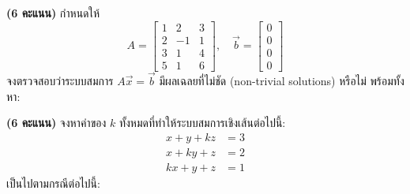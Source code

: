 ﻿\documentclass[12pt, a4paper]{exam}
\begin{document}
\begin{questions}

\newpage

\question \textbf{(6 คะแนน)} กำหนดให้
\[
A = \begin{bmatrix} 
1 & 2 & 3 \\ 
2 & -1 & 1 \\ 
3 & 1 & 4 \\ 
5 & 1 & 6 
\end{bmatrix}, \quad
\vec{b} = \begin{bmatrix} 
0 \\ 0 \\ 0 \\ 0 
\end{bmatrix}
\]
จงตรวจสอบว่าระบบสมการ $A\vec{x} = \vec{b}$ มีผลเฉลยที่ไม่ชัด (non-trivial solutions) \mbox{หรือไม่} พร้อมทั้งหา:

\newpage

\question \textbf{(6 คะแนน)} จงหาค่าของ $k$ ทั้งหมดที่ทำให้ระบบสมการเชิงเส้นต่อไปนี้:
\[
\begin{aligned}
x + y + kz &= 3 \\
x + ky + z &= 2 \\
kx + y + z &= 1
\end{aligned}
\]
เป็นไปตามกรณีต่อไปนี้:
\begin{parts}

\end{parts}
\end{questions}
\end{document}
